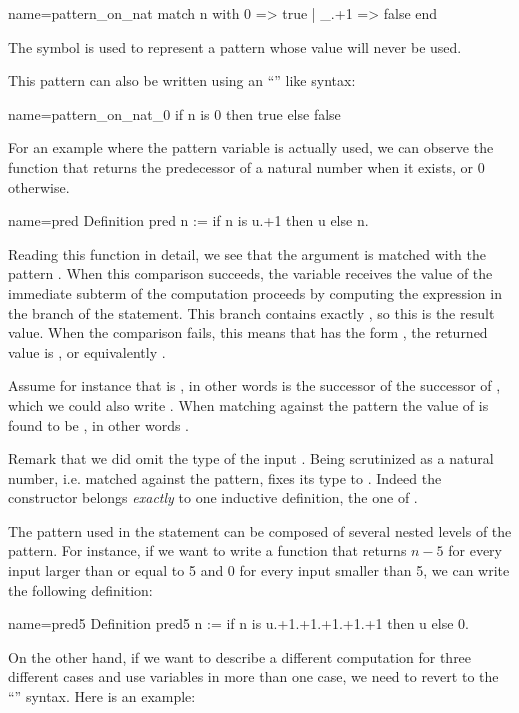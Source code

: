 \begin{coq}{name=pattern_on_nat}{}
match n with 0 => true | _.+1 => false end
\end{coq}
The symbol \C{_} is used to represent a pattern whose value will never be
used.

This pattern can also be written using an ``'' like
syntax:

\begin{coq}{name=pattern_on_nat_0}{}
if n is 0 then true else false
\end{coq}

For an example where the pattern variable is actually used, we can
observe the function that returns the predecessor of a natural number
when it exists, or 0 otherwise.

\begin{coq}{name=pred}{}
Definition pred n := if n is u.+1 then u else n.
\end{coq}
Reading this function in detail, we see that the argument  is
matched with the pattern .  When this comparison
succeeds, the variable  receives the value of the immediate
subterm of  the computation proceeds by computing the expression
in the  branch of the  statement.  This branch contains
exactly , so this is the result value.  When the comparison
fails, this means that  has the form , the returned value is
, or equivalently .

Assume for instance that  is , in other words  is the
successor of the successor of , which we could also write
.  When matching  against the pattern 
the value of  is found to be , in other words .

Remark that we did omit the type of the input .  Being  scrutinized
as a natural number, i.e. matched against the  pattern, \Coq{} fixes its
type to .  Indeed the  constructor belongs \emph{exactly}
to one inductive definition, the one of .

The pattern used in the  statement can be composed of
several nested levels of the  pattern.  For instance,
if we want to write a function
that returns \(n-5\) for every input larger than or equal to 5 and 0
for every input smaller than 5, we can write the following definition:

\begin{coq}{name=pred5}{}
Definition pred5 n :=
  if n is u.+1.+1.+1.+1.+1 then u else 0.
\end{coq}
On the other hand, if we want to describe a different computation for
three different cases and use variables in more than one case, we need
to revert to the ``'' syntax.  Here is an
example:

